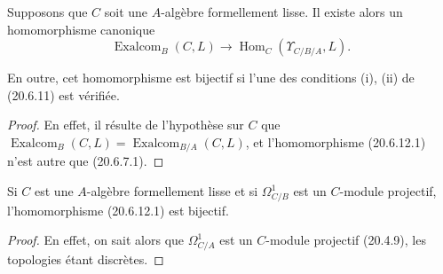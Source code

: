 \begin{corollary}[20.6.12]
\label{0.20.6.12-fr}
Supposons que $C$ soit une $A$-algèbre formellement lisse. Il existe alors
un homomorphisme canonique
\begin{equation}
\tag{20.6.12.1}
\label{0.20.6.12.1-fr}
  \operatorname{Exalcom}_B(C,L)\longrightarrow
  \operatorname{Hom}_C(\Upsilon_{C/B/A},L).
\end{equation}

En outre, cet homomorphisme est bijectif si l'une des conditions \textup{(i)},
\textup{(ii)} de \textup{(20.6.11)} est vérifiée.
\end{corollary}

\begin{proof}
En effet, il résulte de l'hypothèse sur $C$ que
$\operatorname{Exalcom}_B(C,L)=\operatorname{Exalcom}_{B/A}(C,L)$, et
l'homomorphisme (20.6.12.1) n'est autre que (20.6.7.1).
\end{proof}

\begin{corollary}[20.6.13]
\label{0.20.6.13-fr}
Si $C$ est une $A$-algèbre formellement lisse et si $\Omega^1_{C/B}$ est
un $C$-module projectif, l'homomorphisme \textup{(20.6.12.1)} est bijectif.
\end{corollary}

\begin{proof}
En effet, on sait alors que $\Omega^1_{C/A}$ est un $C$-module projectif
(20.4.9), les topologies étant discrètes.
\end{proof}

